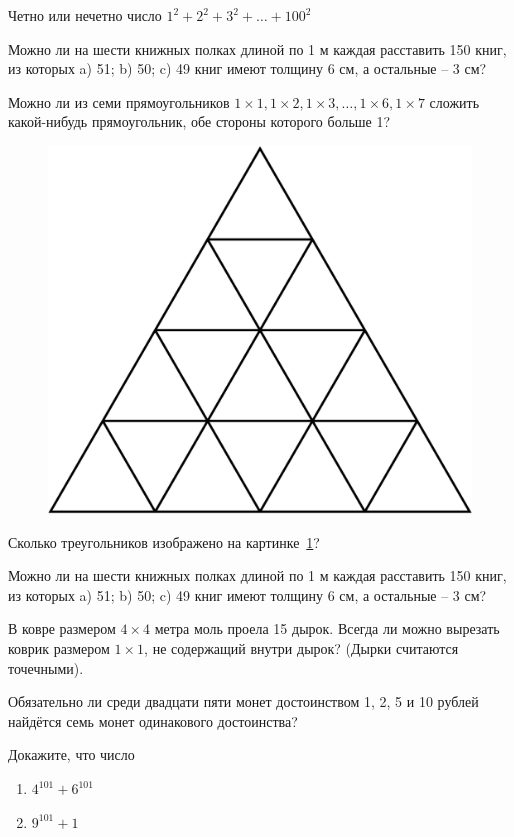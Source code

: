 \documentclass{article}
\begin{document}
\begin{enumerate_boxed}
        \item Четно или нечетно число $1^2 +2^2 +3^2 +\dotsc+100^2$

        \item Можно ли на шести книжных полках длиной по 1 м каждая расставить 150 книг, из которых a) 51; b) 50; c) 49 книг имеют толщину 6 см, а остальные – 3 см?

        \item Можно ли из семи прямоугольников $1 \times1, 1 \times2, 1 \times3, \dots, 1 \times6, 1 \times7$ сложить какой-нибудь прямоугольник, обе стороны которого больше 1?

        \begin{figure}[h]
            \centering
            \includegraphics[width=0.3\linewidth]{triangle1}
            \caption{}
            \label{fig:triangle1}
        \end{figure}

        \item Сколько треугольников изображено на картинке~\ref{fig:triangle1}?

        \item Можно ли на шести книжных полках длиной по 1 м каждая расставить 150 книг, из которых a) 51; b) 50; c) 49 книг имеют толщину 6 см, а остальные – 3 см?

        \item В ковре размером $4 \times 4$ метра моль проела 15 дырок.
        Всегда ли можно вырезать коврик размером $1 \times 1$, не содержащий внутри дырок?
        (Дырки считаются точечными).

        \item Обязательно ли среди двадцати пяти монет достоинством 1, 2, 5 и 10 рублей найдётся семь монет одинакового достоинства?

        \item Докажите, что число

        \begin{enumerate}
            \item $4^{101} + 6^{101}$

            \item $9^{101} + 1$
        \end{enumerate}


\end{enumerate_boxed}
\end{document}
